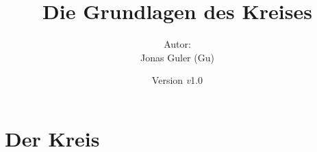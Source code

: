 \documentclass[11pt,oneside]{article}
\newcommand{\Skriptname}{Die Grundlagen des Kreises}
\newcommand{\Autor}{Jonas Guler (Gu)}
\newcommand{\version}{\textit{v}1.0}
\begin{document}
\begin{titlepage}
	\clearpage
	\title{\Huge\textbf{\Skriptname} \\[1cm]}
	\author{Autor:\\ \Autor}
	\date{\normalsize {Version \version}\\ \datelong}
	\maketitle
	\thispagestyle{empty}
	\vfill
	\tableofcontents
\end{titlepage}
\section{Der Kreis}
\end{document}
